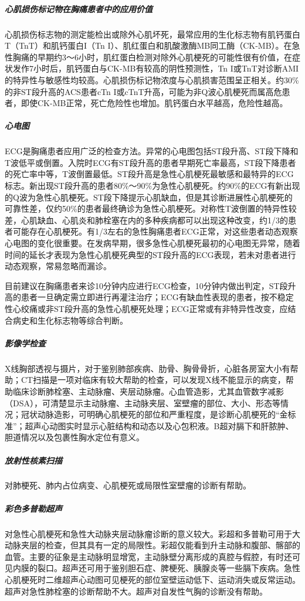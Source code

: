 \subparagraph{心肌损伤标记物在胸痛患者中的应用价值}

心肌损伤标志物的测定能检出或除外心肌坏死，最常应用的生化标志物有肌钙蛋白T（TnT）和肌钙蛋白I（Tn
I）、肌红蛋白和肌酸激酶MB同工酶（CK-MB）。在急性胸痛的早期约3～6小时，肌红蛋白检测对除外心肌梗死的可能性很有价值，在症状发作7小时后，肌钙蛋白与CK-MB有较高的阴性预测性，Tn
I或TnT对诊断AMI的特异性与敏感性均较高。心肌损伤标记物浓度与心肌损害范围呈正相关。约30\%的非ST段升高的ACS患者cTn
I或cTnT升高，可能为非Q波心肌梗死而属高危患者，即使CK-MB正常，死亡危险性也增加。肌钙蛋白水平越高，危险性越高。

\subparagraph{心电图}

ECG是胸痛患者应用广泛的检查方法。异常的心电图包括ST段升高、ST段下降和T波低平或倒置。入院时ECG有ST段升高的患者早期死亡率最高，ST段下降患者的死亡率中等，T波倒置最低。ST段升高是急性心肌梗死最敏感和最特异的ECG标志。新出现ST段升高的患者80\%～90\%为急性心肌梗死。约90\%的ECG有新出现的Q波为急性心肌梗死。ST段下降提示心肌缺血，但是其诊断进展性心肌梗死的可靠性差，仅约50\%的患者最终确诊为急性心肌梗死。对称性T波倒置的特异性较差，心肌缺血、心肌炎和肺栓塞在内的多种疾病都可以出现这种改变，约1/3的患者可能存在心肌梗死。有1/3左右的急性胸痛患者ECG正常，对这些患者动态观察心电图的变化很重要。在发病早期，很多急性心肌梗死最初的心电图无异常，随着时间的延长才表现为急性心肌梗死典型的ST段升高的ECG表现，若未对患者进行动态观察，常易忽略而漏诊。

目前建议在胸痛患者来诊10分钟内应进行ECG检查，10分钟内做出判定，ST段升高的患者一旦确定需立即进行再灌注治疗；ECG有缺血性表现的患者，按不稳定性心绞痛或非ST段升高的急性心肌梗死处理；ECG正常或有非特异性改变，应结合病史和生化标志物等综合判断。

\subparagraph{影像学检查}

X线胸部透视与摄片，对于鉴别肺部疾病、肋骨、胸骨骨折，心脏各房室大小有帮助；CT扫描是一项对临床有较大帮助的检查，可以发现X线不能显示的病变，帮助临床诊断肺栓塞、主动脉瘤、夹层动脉瘤。心血管造影，尤其血管数字减影（DSA），可清楚显示主动脉瘤、主动脉夹层、室壁瘤的部位、大小、形态等情况；冠状动脉造影，可明确心肌梗死的部位和严重程度，是诊断心肌梗死的“金标准”；超声心动图实时显示心脏结构和动态以及心包积液。B超对膈下和肝脓肿、胆道情况以及包裹性胸水定位有意义。

\subparagraph{放射性核素扫描}

对肺梗死、肺内占位病变、心肌梗死或局限性室壁瘤的诊断有帮助。

\subparagraph{彩色多普勒超声}

对急性心肌梗死和急性大动脉夹层动脉瘤诊断的意义较大。彩超和多普勒可用于大动脉夹层的检查，但其具有一定的局限性。彩超仅能看到升主动脉和腹部、髂部的血管。主要的征象是主动脉明显增宽，主动脉壁分离形成的真腔与假腔，有时还可见内膜的裂口。超声还可用于鉴别胆石症、脾梗死、胰腺炎等一些膈下疾病。急性心肌梗死时二维超声心动图可见梗死的部位室壁运动低下、运动消失或反常运动。超声对急性肺栓塞的诊断帮助不大。超声对自发性气胸的诊断没有帮助。

